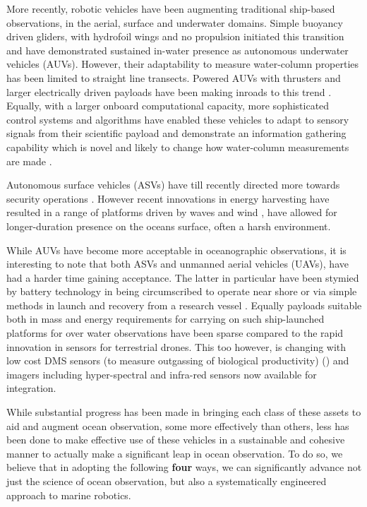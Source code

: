 More recently, robotic vehicles have been augmenting traditional
ship-based observations, in the aerial, surface and underwater
domains. Simple buoyancy driven gliders, with hydrofoil wings and no
propulsion initiated this transition and have demonstrated sustained
in-water presence \cite{rucool11} as autonomous underwater vehicles
(AUVs). However, their adaptability to measure water-column properties
has been limited to straight line transects. Powered AUVs with
thrusters and larger electrically driven payloads have been making
inroads to this trend \cite{loch89,dorado2004,Bellingham07}. Equally,
with a larger onboard computational capacity, more sophisticated
control systems and algorithms have enabled these vehicles to adapt to
sensory signals from their scientific payload and demonstrate an
information gathering capability which is novel and likely to change
how water-column measurements are made
\cite{bellingham94,aosn93,ryan10,das11b,das15,fossum18,fossum18b}.

Autonomous surface vehicles (ASVs) have till recently directed more
towards security operations \cite{wolf10}. However recent innovations
in energy harvesting have resulted in a range of platforms driven by
waves \cite{waveglider,verfuss19} and wind \cite{gentemann20,ghani14},
have allowed for longer-duration presence on the oceans surface, often
a harsh environment.

While AUVs have become more acceptable in oceanographic observations,
it is interesting to note that both ASVs and unmanned aerial vehicles
(UAVs), have had a harder time gaining acceptance. The latter in
particular have been stymied by battery technology in being
circumscribed to operate near shore or via simple methods in launch
and recovery from a research vessel \cite{Ferreira2018}. Equally
payloads suitable both in mass and energy requirements for carrying on
such ship-launched platforms for over water observations have been
sparse compared to the rapid innovation in sensors for terrestrial
drones. This too however, is changing with low cost DMS sensors (to
measure outgassing of biological productivity) () and imagers
including hyper-spectral \cite{sigernes18} and infra-red sensors now
available for integration.

While substantial progress has been made in bringing each class of
these assets to aid and augment ocean observation, some more
effectively than others, less has been done to make effective use of
these vehicles in a sustainable and cohesive manner to actually make a
significant leap in ocean observation. To do so, we believe that in
adopting the following \textbf{four} ways, we can significantly
advance not just the science of ocean observation, but also a
systematically engineered approach to marine robotics.

